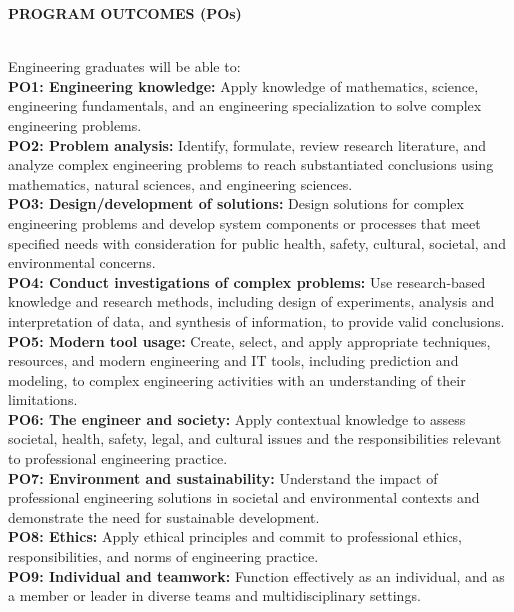 \newcommand{\normal}{\fontsize{12pt}{16pt}\selectfont}
\newcommand{\size}{\fontsize{14pt}{18pt}\selectfont}
\newcommand{\bigsize}{\fontsize{16pt}{20pt}\selectfont}
\newcommand{\bigbigsize}{\fontsize{20pt}{24pt}\selectfont}
\begin{flushleft}
\size\textbf{PROGRAM OUTCOMES (POs)}
\end{flushleft}
\\
Engineering graduates will be able to:
\vspace{5mm}\\
\textbf{PO1: Engineering knowledge:} Apply knowledge of mathematics, science, engineering fundamentals, and an engineering specialization to solve complex engineering problems.\\
\textbf{PO2: Problem analysis:} Identify, formulate, review research literature, and analyze complex engineering problems to reach substantiated conclusions using mathematics, natural sciences, and engineering sciences.\\
\textbf{PO3: Design/development of solutions:} Design solutions for complex engineering problems and develop system components or processes that meet specified needs with consideration for public health, safety, cultural, societal, and environmental concerns.\\
\textbf{PO4: Conduct investigations of complex problems:} Use research-based knowledge and research methods, including design of experiments, analysis and interpretation of data, and synthesis of information, to provide valid conclusions.\\
\textbf{PO5: Modern tool usage:} Create, select, and apply appropriate techniques, resources, and modern engineering and IT tools, including prediction and modeling, to complex engineering activities with an understanding of their limitations.\\
\textbf{PO6: The engineer and society:} Apply contextual knowledge to assess societal, health, safety, legal, and cultural issues and the responsibilities relevant to professional engineering practice.\\
\textbf{PO7: Environment and sustainability:} Understand the impact of professional engineering solutions in societal and environmental contexts and demonstrate the need for sustainable development.\\
\textbf{PO8: Ethics:} Apply ethical principles and commit to professional ethics, responsibilities, and norms of engineering practice.\\
\textbf{PO9: Individual and teamwork:} Function effectively as an individual, and as a member or leader in diverse teams and multidisciplinary settings.\\
